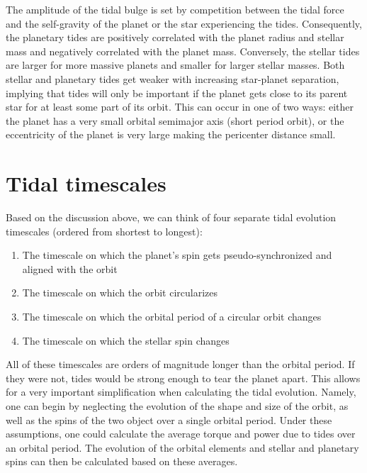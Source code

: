 The amplitude of the tidal bulge is set by competition between the tidal force
and the self-gravity of the planet or the star experiencing the tides.
Consequently, the planetary tides are positively correlated with the planet
radius and stellar mass and negatively correlated with the planet mass.
Conversely, the stellar tides are larger for more massive planets and smaller
for larger stellar masses. Both stellar and planetary tides get weaker with
increasing star-planet separation, implying that tides will only be important if
the planet gets close to its parent star for at least some part of its orbit.
This can occur in one of two ways: either the planet has a very small orbital
semimajor axis (short period orbit), or the eccentricity of the planet is very
large making the pericenter distance small.

\section{Tidal timescales}

Based on the discussion above, we can think of four separate tidal evolution
timescales (ordered from shortest to longest):

\begin{enumerate}
%
    \item The timescale on which the planet's spin gets pseudo-synchronized and
        aligned with the orbit
%
    \item The timescale on which the orbit circularizes
%
    \item The timescale on which the orbital period of a circular orbit changes
%
    \item The timescale on which the stellar spin changes
%
\end{enumerate}

All of these timescales are orders of magnitude longer than the orbital period.
If they were not, tides would be strong enough to tear the planet apart. This
allows for a very important simplification when calculating the tidal evolution.
Namely, one can begin by neglecting the evolution of the shape and size of the
orbit, as well as the spins of the two object over a single orbital period.
Under these assumptions, one could calculate the average torque and power due to
tides over an orbital period. The evolution of the orbital elements and stellar
and planetary spins can then be calculated based on these averages.

